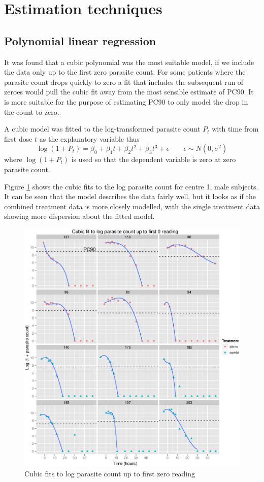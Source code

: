 \section{Estimation techniques}
\subsection{Polynomial linear regression}
It was found that a cubic polynomial was the most suitable model, if we include the data only up to the first zero parasite count. For some patients where the parasite count drops quickly to zero a fit that includes the subsequent run of zeroes would pull the cubic fit away from the most sensible estimate of PC90. It is more suitable for the purpose of estimating PC90 to only model the drop in the count to zero.

A cubic model was fitted to the log-transformed parasite count $P_{t}$ with time from first dose $t$ as the explanatory variable thus
$$\log(1+P_{t})=\beta_0+\beta_1t+\beta_2t^2+\beta_3t^3+\epsilon\quad\quad\epsilon\sim N(0,\sigma^2)$$
where $\log(1+P_{t})$ is used so that the dependent variable is zero at zero parasite count.

Figure \ref{cubics} shows the cubic fits to the log parasite count for centre 1, male subjects. It can be seen that the model describes the data fairly well, but it looks as if the combined treatment data is more closely modelled, with the single treatment data showing more dispersion about the fitted model. 
\begin{figure}[h]
\includegraphics[width=150mm]{cubics.eps} 
\caption{Cubic fits to log parasite count up to first zero reading}\label{cubics}
\end{figure}

